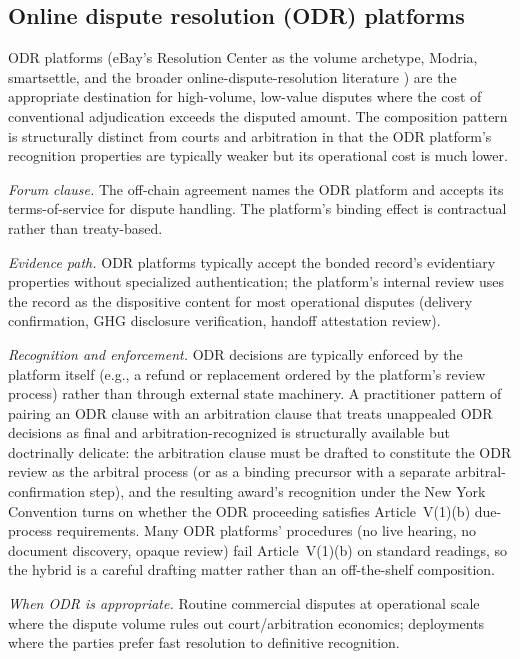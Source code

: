 \documentclass[11pt,a4paper]{article}
\theoremstyle{remark}
\begin{document}
\subsection{Online dispute resolution (ODR) platforms}

ODR platforms (eBay's Resolution Center as the volume archetype,
Modria, smartsettle, and the broader online-dispute-resolution
literature \citep{rabinovich_einy_katsh_2017}) are the
appropriate destination for high-volume, low-value disputes
where the cost of conventional adjudication exceeds the
disputed amount. The composition pattern is structurally
distinct from courts and arbitration in that the ODR platform's
recognition properties are typically weaker but its operational
cost is much lower.

\emph{Forum clause.} The off-chain agreement names the ODR
platform and accepts its terms-of-service for dispute handling.
The platform's binding effect is contractual rather than
treaty-based.

\emph{Evidence path.} ODR platforms typically accept the bonded
record's evidentiary properties without specialized
authentication; the platform's internal review uses the record
as the dispositive content for most operational disputes
(delivery confirmation, GHG disclosure verification, handoff
attestation review).

\emph{Recognition and enforcement.} ODR decisions are typically
enforced by the platform itself (e.g., a refund or replacement
ordered by the platform's review process) rather than through
external state machinery. A practitioner pattern of pairing an
ODR clause with an arbitration clause that treats unappealed
ODR decisions as final and arbitration-recognized is
structurally available but doctrinally delicate: the arbitration
clause must be drafted to constitute the ODR review as the
arbitral process (or as a binding precursor with a separate
arbitral-confirmation step), and the resulting award's
recognition under the New York Convention turns on whether the
ODR proceeding satisfies Article~V(1)(b) due-process
requirements. Many ODR platforms' procedures (no live hearing,
no document discovery, opaque review) fail Article~V(1)(b) on
standard readings, so the hybrid is a careful drafting matter
rather than an off-the-shelf composition.

\emph{When ODR is appropriate.} Routine commercial disputes at
operational scale where the dispute volume rules out
court/arbitration economics; deployments where the parties
prefer fast resolution to definitive recognition.
\end{document}
